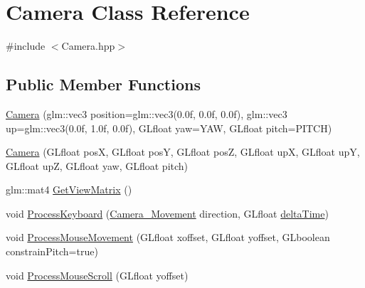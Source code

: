 \hypertarget{classCamera}{}\section{Camera Class Reference}
\label{classCamera}


{\ttfamily \#include $<$Camera.\+hpp$>$}

\subsection*{Public Member Functions}
\begin{DoxyCompactItemize}
\item 
\hyperlink{classCamera_a535f3a2413a88c2f1e7d1147bec0039c}{Camera} (glm\+::vec3 position=glm\+::vec3(0.\+0f, 0.\+0f, 0.\+0f), glm\+::vec3 up=glm\+::vec3(0.\+0f, 1.\+0f, 0.\+0f), G\+Lfloat yaw=\+Y\+A\+W, G\+Lfloat pitch=\+P\+I\+T\+C\+H)
\item 
\hyperlink{classCamera_a1efd973829c22d5fe15a26ede3357ee5}{Camera} (G\+Lfloat posX, G\+Lfloat posY, G\+Lfloat posZ, G\+Lfloat upX, G\+Lfloat upY, G\+Lfloat upZ, G\+Lfloat yaw, G\+Lfloat pitch)
\item 
glm\+::mat4 \hyperlink{classCamera_affa333055635aed96518c4c66be9a70c}{Get\+View\+Matrix} ()
\item 
void \hyperlink{classCamera_ac7e9a7f3e63c670fd695a8f03d02dbdf}{Process\+Keyboard} (\hyperlink{Camera_8hpp_a605494501af59c9191e7e4d6f9a0ebcb}{Camera\+\_\+\+Movement} direction, G\+Lfloat \hyperlink{test_8cpp_adf7cb443fa70a647d5603ee33b392102}{delta\+Time})
\item 
void \hyperlink{classCamera_a97ffbf8d8935fc63bd2ca71a4268eec4}{Process\+Mouse\+Movement} (G\+Lfloat xoffset, G\+Lfloat yoffset, G\+Lboolean constrain\+Pitch=true)
\item 
void \hyperlink{classCamera_af269e5ef38e791afb7f4a1dfb8da2399}{Process\+Mouse\+Scroll} (G\+Lfloat yoffset)
\end{DoxyCompactItemize}
